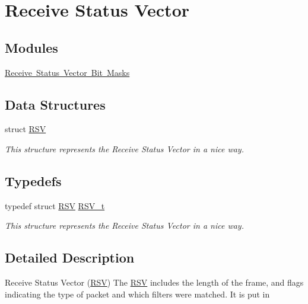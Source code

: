 \hypertarget{group__rsv}{}\section{Receive Status Vector}
\label{group__rsv}
\subsection*{Modules}
\begin{DoxyCompactItemize}
\item 
\mbox{\hyperlink{group__rsv_bits}{Receive Status Vector Bit Masks}}
\end{DoxyCompactItemize}
\subsection*{Data Structures}
\begin{DoxyCompactItemize}
\item 
struct \mbox{\hyperlink{struct_r_s_v}{R\+SV}}
\begin{DoxyCompactList}\small\item\em This structure represents the Receive Status Vector in a nice way. \end{DoxyCompactList}\end{DoxyCompactItemize}
\subsection*{Typedefs}
\begin{DoxyCompactItemize}
\item 
typedef struct \mbox{\hyperlink{struct_r_s_v}{R\+SV}} \mbox{\hyperlink{group__rsv_gaf7fd94a9424fccb0aafa846f27a43099}{R\+S\+V\+\_\+t}}
\begin{DoxyCompactList}\small\item\em This structure represents the Receive Status Vector in a nice way. \end{DoxyCompactList}\end{DoxyCompactItemize}


\subsection{Detailed Description}
Receive Status Vector (\mbox{\hyperlink{struct_r_s_v}{R\+SV}}) The \mbox{\hyperlink{struct_r_s_v}{R\+SV}} includes the length of the frame, and flags indicating the type of packet and which filters were matched. It is put in 

